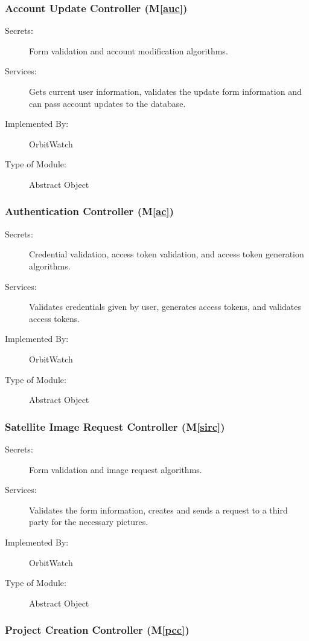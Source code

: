 \documentclass[12pt, titlepage]{article}
\newcommand{\mref}[1]{M\ref{#1}}
\begin{document}
\subsubsection{Account Update Controller (\mref{auc})}

\begin{description}
\item[Secrets:] Form validation and account modification algorithms.
\item[Services:] Gets current user information, validates the update form information and can pass account updates to the database.
\item[Implemented By:] OrbitWatch
\item[Type of Module:] Abstract Object
\end{description}

\subsubsection{Authentication Controller (\mref{ac})}

\begin{description}
\item[Secrets:] Credential validation, access token validation, and access token generation algorithms.
\item[Services:] Validates credentials given by user, generates access tokens, and validates access tokens.
\item[Implemented By:] OrbitWatch
\item[Type of Module:] Abstract Object
\end{description}

\subsubsection{Satellite Image Request Controller (\mref{sirc})}

\begin{description}
\item[Secrets:] Form validation and image request algorithms.
\item[Services:] Validates the form information, creates and sends a request to a third party for the necessary pictures.
\item[Implemented By:] OrbitWatch
\item[Type of Module:] Abstract Object
\end{description}

\subsubsection{Project Creation Controller (\mref{pcc})}
\end{document}
